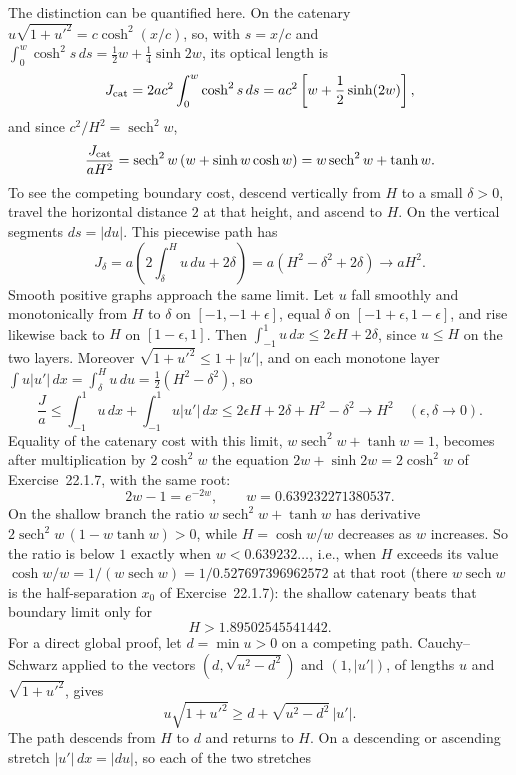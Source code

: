 The distinction can be quantified here. On the catenary
$u\sqrt{1+u'^2}=c\cosh^2(x/c)$, so, with $s=x/c$ and
$\int_0^w\cosh^2s\,ds=\tfrac12w+\tfrac14\sinh2w$, its optical length
is
\[
J_{\rm cat}=2ac^2\int_0^w\cosh^2s\,ds
=ac^2\left[w+\frac12\sinh(2w)\right],
\]
and since $c^2/H^2=\operatorname{sech}^2w$,
\[
\frac{J_{\rm cat}}{aH^2}
=\operatorname{sech}^2w\,(w+\sinh w\cosh w)
=w\operatorname{sech}^2w+\tanh w.
\]
To see the competing boundary cost, descend vertically from $H$
to a small $\delta>0$, travel the horizontal distance $2$ at that
height, and ascend to $H$. On the vertical segments $ds=|du|$. This
piecewise path has
\[
 J_\delta=a\left(2\int_\delta^H u\,du+2\delta\right)
 =a(H^2-\delta^2+2\delta)\longrightarrow aH^2.
\]
Smooth positive graphs approach the same limit. Let $u$ fall smoothly and
monotonically from $H$ to $\delta$ on $[-1,-1+\epsilon]$, equal
$\delta$ on $[-1+\epsilon,1-\epsilon]$, and rise likewise back to $H$
on $[1-\epsilon,1]$. Then $\int_{-1}^1u\,dx\le2\epsilon H+2\delta$,
since $u\le H$ on the two layers. Moreover $\sqrt{1+u'^2}\le1+|u'|$,
and on each monotone layer
$\int u|u'|\,dx=\int_\delta^Hu\,du=\tfrac12(H^2-\delta^2)$, so
\[
\frac Ja\le\int_{-1}^1u\,dx+\int_{-1}^1u|u'|\,dx
\le2\epsilon H+2\delta+H^2-\delta^2\longrightarrow H^2
\quad(\epsilon,\delta\to0).
\]
Equality of the catenary cost with this limit,
$w\operatorname{sech}^2w+\tanh w=1$, becomes after multiplication by
$2\cosh^2w$ the equation $2w+\sinh2w=2\cosh^2w$ of Exercise~22.1.7,
with the same root:
\[
2w-1=e^{-2w},\qquad w=0.639232271380537.
\]
On the shallow branch the ratio
$w\operatorname{sech}^2w+\tanh w$ has derivative
$2\operatorname{sech}^2w\,(1-w\tanh w)>0$, while
$H=\cosh w/w$ decreases as $w$ increases. So the ratio is below $1$
exactly when $w<0.639232\ldots$, i.e., when $H$ exceeds its value
$\cosh w/w=1/(w\operatorname{sech}w)=1/0.527697396962572$ at that root
(there $w\operatorname{sech}w$ is the half-separation $x_0$ of
Exercise~22.1.7): the shallow catenary beats that boundary limit
only for
\[
H>1.89502545541442.
\]
For a direct global proof, let $d=\min u>0$ on a competing
path. Cauchy--Schwarz applied to the vectors
$(d,\sqrt{u^2-d^2})$ and $(1,|u'|)$, of lengths $u$ and
$\sqrt{1+u'^2}$, gives
\[
 u\sqrt{1+u'^2}\ge d+\sqrt{u^2-d^2}\,|u'|.
\]
The path descends from $H$ to $d$ and returns to $H$. On a descending
or ascending stretch $|u'|\,dx=|du|$, so each of the two stretches
